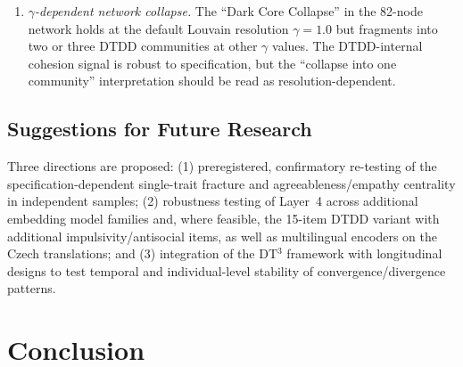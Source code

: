 \documentclass[11pt,twocolumn]{article}
\begin{document}
\begin{enumerate}[leftmargin=1.2em,itemsep=0pt,topsep=2pt]
\item \textit{$\gamma$-dependent network collapse.} The ``Dark Core Collapse'' in the 82-node network holds at the default Louvain resolution $\gamma = 1.0$ but fragments into two or three DTDD communities at other $\gamma$ values. The DTDD-internal cohesion signal is robust to specification, but the ``collapse into one community'' interpretation should be read as resolution-dependent.
\end{enumerate}

\subsection{Suggestions for Future Research}

Three directions are proposed: (1) preregistered, confirmatory re-testing of the specification-dependent single-trait fracture and agreeableness/empathy centrality in independent samples; (2) robustness testing of Layer~4 across additional embedding model families and, where feasible, the 15-item DTDD variant with additional impulsivity/antisocial items, as well as multilingual encoders on the Czech translations; and (3) integration of the DT$^3$ framework with longitudinal designs to test temporal and individual-level stability of convergence/divergence patterns.

\section{Conclusion}
\end{document}
